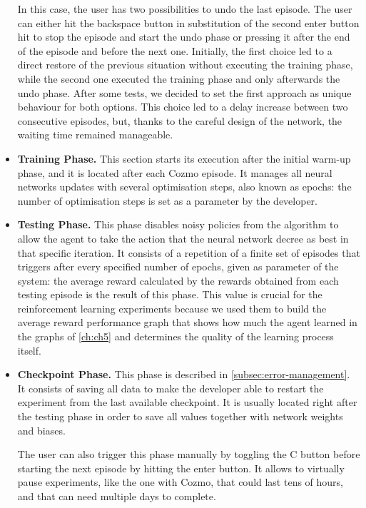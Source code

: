 \begin{itemize}
          In this case, the user has two possibilities to undo the last episode.
          The user can either hit the backspace button in substitution of the second enter button hit to stop the episode and start the undo phase or pressing it after the end of the episode and before the next one.
          Initially, the first choice led to a direct restore of the previous situation without executing the training phase, while the second one executed the training phase and only afterwards the undo phase.
          After some tests, we decided to set the first approach as unique behaviour for both options.
          This choice led to a delay increase between two consecutive episodes, but, thanks to the careful design of the network, the waiting time remained manageable.
    \item \textbf{Training Phase.} This section starts its execution after the initial warm-up phase, and it is located after each Cozmo episode.
          It manages all neural networks updates with several optimisation steps, also known as epochs: the number of optimisation steps is set as a parameter by the developer.
    \item \textbf{Testing Phase.} This phase disables noisy policies from the algorithm to allow the agent to take the action that the neural network decree as best in that specific iteration.
          It consists of a repetition of a finite set of episodes that triggers after every specified number of epochs, given as parameter of the system: the average reward calculated by the rewards obtained from each testing episode is the result of this phase.
          This value is crucial for the reinforcement learning experiments because we used them to build the average reward performance graph that shows how much the agent learned in the graphs of \vref{ch:ch5} and determines the quality of the learning process itself.
    \item \textbf{Checkpoint Phase.} This phase is described in \vref{subsec:error-management}.
          It consists of saving all data to make the developer able to restart the experiment from the last available checkpoint.
          It is usually located right after the testing phase in order to save all values together with network weights and biases.

          The user can also trigger this phase manually by toggling the C button before starting the next episode by hitting the enter button.
          It allows to virtually pause experiments, like the one with Cozmo, that could last tens of hours, and that can need multiple days to complete.
\end{itemize}



